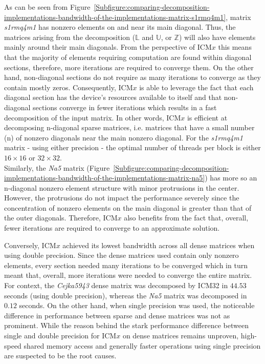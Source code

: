As can be seen from Figure~\ref{Subfigure:comparing-decomposition-implementations-bandwidth-of-the-implementations-matrix-s1rmq4m1}, matrix \textit{s1rmq4m1} has nonzero elements on and near its main diagonal. Thus, the matrices arising from the decomposition ($ \mathbb{L} $ and $ \mathbb{U} $, or $ \mathbb{Z} $) will also have elements mainly around their main diagonals. From the perspective of ICM$ x $ this means that the majority of elements requiring computation are found within diagonal sections, therefore, more iterations are required to converge them. On the other hand, non-diagonal sections do not require as many iterations to converge as they contain mostly zeros. Consequently, ICM$ x $ is able to leverage the fact that each diagonal section has the device's resources available to itself and that non-diagonal sections converge in fewer iterations which results in a fast decomposition of the input matrix. In other words, ICM$ x $ is efficient at decomposing n-diagonal sparse matrices, i.e. matrices that have a small number (n) of nonzero diagonals near the main nonzero diagonal. For the \textit{s1rmq4m1} matrix - using either precision - the optimal number of threads per block is either $ 16 \times 16 $ or $ 32 \times 32 $. \\
Similarly, the \textit{Na5} matrix (Figure~\ref{Subfigure:comparing-decomposition-implementations-bandwidth-of-the-implementations-matrix-na5}) has more so an n-diagonal nonzero element structure with minor protrusions in the center. However, the protrusions do not impact the performance severely since the concentration of nonzero elements on the main diagonal is greater than that of the outer diagonals. Therefore, ICM$ x $ also benefits from the fact that, overall, fewer iterations are required to converge to an approximate solution.
\par Conversely, ICM$ x $ achieved its lowest bandwidth across all dense matrices when using double precision. Since the dense matrices used contain only nonzero elements, every section needed many iterations to be converged which in turn meant that, overall, more iterations were needed to converge the entire matrix. For context, the \textit{Cejka5943} dense matrix was decomposed by ICM32 in $ 44.53 $ seconds (using double precision), whereas the \textit{Na5} matrix was decomposed in $ 0.12 $ seconds. On the other hand, when single precision was used, the noticeable difference in performance between sparse and dense matrices was not as prominent. While the reason behind the stark performance difference between single and double precision for ICM$ x $ on dense matrices remains unproven, high-speed shared memory access and generally faster operations using single precision are suspected to be the root causes.
